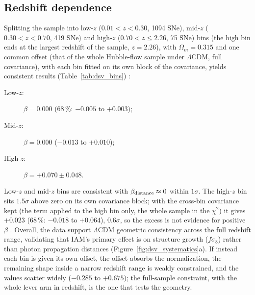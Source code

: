 \subsection{Redshift dependence}
Splitting the sample into low-$z$ ($0.01<z<0.30$, 1094 SNe), mid-$z$ ($0.30<z<0.70$, 419 SNe) and high-$z$ ($0.70<z\le2.26$, 75 SNe) bins (the high bin ends at the largest redshift of the sample, $z=2.26$), with $\Omega_m=0.315$
and one common offset (that of the whole Hubble-flow sample under $\Lambda$CDM, full covariance), with each bin fitted on its own block of the
covariance, yields consistent results (Table~\ref{tab:dsv_bins}) \calc:
\begin{description}
\item[Low-$z$:] $\beta=0.000$ ($68\,\%$: $-0.005$ to $+0.003$);
\item[Mid-$z$:] $\beta=0.000$ ($-0.013$ to $+0.010$);
\item[High-$z$:] $\beta=+0.070\pm0.048$.
\end{description}
Low-$z$ and mid-$z$ bins are consistent with $\beta_{\rm distance}\approx0$ within $1\sigma$. The high-$z$ bin sits $1.5\sigma$ above zero on its own
covariance block; with the cross-bin covariance kept (the term applied to the high bin only, the whole sample in the $\chi^2$) it gives
$+0.023$ ($68\,\%$: $-0.018$ to $+0.064$), $0.6\sigma$, so the excess is not evidence for positive $\beta$ \calc. Overall, the data support $\Lambda$CDM
geometric consistency across the full redshift range, validating that IAM's primary effect is on structure growth ($f\sigma_8$) rather than photon
propagation distances (Figure~\ref{fig:dsv_systematics}a). If instead each bin is given its own offset, the offset absorbs the normalization, the
remaining shape inside a narrow redshift range is weakly constrained, and the values scatter widely ($-0.285$ to $+0.675$); the full-sample constraint, with
the whole lever arm in redshift, is the one that tests the geometry.
